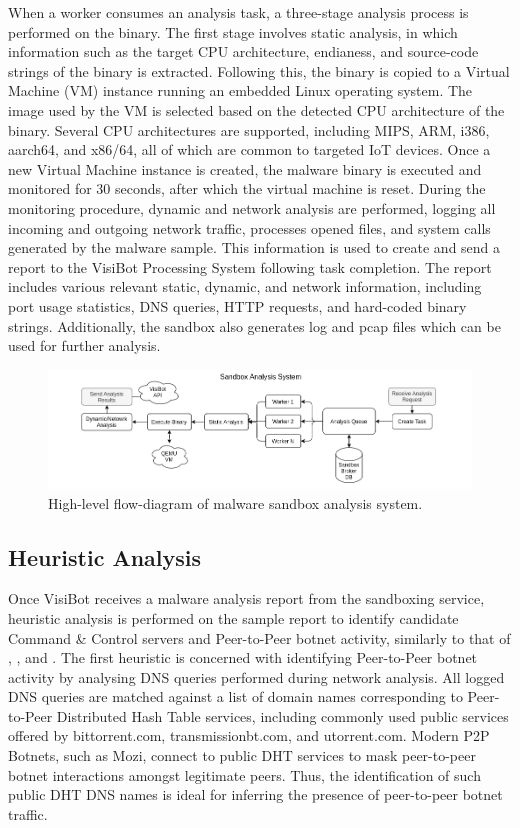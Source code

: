 When a worker consumes an analysis task, a three-stage analysis process is performed on the binary. The first stage involves static analysis, in which information such as the target CPU architecture, endianess, and source-code strings of the binary is extracted. Following this, the binary is copied to a Virtual Machine (VM) instance running an embedded Linux operating system. The image used by the VM is selected based on the detected CPU architecture of the binary. Several CPU architectures are supported, including MIPS, ARM, i386, aarch64, and x86/64, all of which are common to targeted IoT devices. Once a new Virtual Machine instance is created, the malware binary is executed and monitored for 30 seconds, after which the virtual machine is reset. During the monitoring procedure, dynamic and network analysis are performed, logging all incoming and outgoing network traffic, processes opened files, and system calls generated by the malware sample. This information is used to create and send a report to the VisiBot Processing System following task completion. The report includes various relevant static, dynamic, and network information, including port usage statistics, DNS queries, HTTP requests, and hard-coded binary strings. Additionally, the sandbox also generates log and pcap files which can be used for further analysis. 

\begin{figure}[!htb]
    \centering
    \includegraphics[width=0.9\linewidth]{flowcharts/high_level_sandbox_overview.png}
    \caption{High-level flow-diagram of malware sandbox analysis system.}
    \label{fig:high_level_sandbox} 
\end{figure}

\subsection{Heuristic Analysis}

Once VisiBot receives a malware analysis report from the sandboxing service, heuristic analysis is performed on the sample report to identify candidate Command \& Control servers and Peer-to-Peer botnet activity, similarly to that of \citet{Bastos2019}, \citet{Ceron2019}, and \citet{Herwig2019}. The first heuristic is concerned with identifying Peer-to-Peer botnet activity by analysing DNS queries performed during network analysis. All logged DNS queries are matched against a list of domain names corresponding to Peer-to-Peer Distributed Hash Table services, including commonly used public services offered by bittorrent.com, transmissionbt.com, and utorrent.com. Modern P2P Botnets, such as Mozi, connect to public DHT services to mask peer-to-peer botnet interactions amongst legitimate peers. Thus, the identification of such public DHT DNS names is ideal for inferring the presence of peer-to-peer botnet traffic. 

